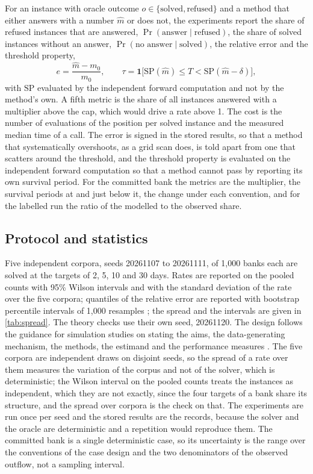 For an instance with oracle outcome $o\in\{\text{solved},\text{refused}\}$ and a method that either answers with a number $\hat m$ or does not, the experiments report the share of refused instances that are answered, $\Pr(\text{answer}\mid\text{refused})$, the share of solved instances without an answer, $\Pr(\text{no answer}\mid\text{solved})$, the relative error and the threshold property,
\begin{equation}
e=\frac{\hat m-m_0}{m_0},\qquad \tau=\mathbf 1\bigl[\mathrm{SP}(\hat m)\le T<\mathrm{SP}(\hat m-\delta)\bigr],
\label{eq:metrics}
\end{equation}
with $\mathrm{SP}$ evaluated by the independent forward computation and not by the method's own. A fifth metric is the share of all instances answered with a multiplier above the cap, which would drive a rate above 1. The cost is the number of evaluations of the position per solved instance and the measured median time of a call. The error is signed in the stored results, so that a method that systematically overshoots, as a grid scan does, is told apart from one that scatters around the threshold, and the threshold property is evaluated on the independent forward computation so that a method cannot pass by reporting its own survival period. For the committed bank the metrics are the multiplier, the survival periods at and just below it, the change under each convention, and for the labelled run the ratio of the modelled to the observed share.

\subsection{Protocol and statistics}

Five independent corpora, seeds 20261107 to 20261111, of 1,000 banks each are solved at the targets of 2, 5, 10 and 30 days. Rates are reported on the pooled counts with 95\% Wilson intervals \citep{brown2001} and with the standard deviation of the rate over the five corpora; quantiles of the relative error are reported with bootstrap percentile intervals of 1,000 resamples \citep{efron1979}; the spread and the intervals are given in \cref{tab:spread}. The theory checks use their own seed, 20261120. The design follows the guidance for simulation studies on stating the aims, the data-generating mechanism, the methods, the estimand and the performance measures \citep{morris2019}. The five corpora are independent draws on disjoint seeds, so the spread of a rate over them measures the variation of the corpus and not of the solver, which is deterministic; the Wilson interval on the pooled counts treats the instances as independent, which they are not exactly, since the four targets of a bank share its structure, and the spread over corpora is the check on that. The experiments are run once per seed and the stored results are the records, because the solver and the oracle are deterministic and a repetition would reproduce them. The committed bank is a single deterministic case, so its uncertainty is the range over the conventions of the case design and the two denominators of the observed outflow, not a sampling interval.
